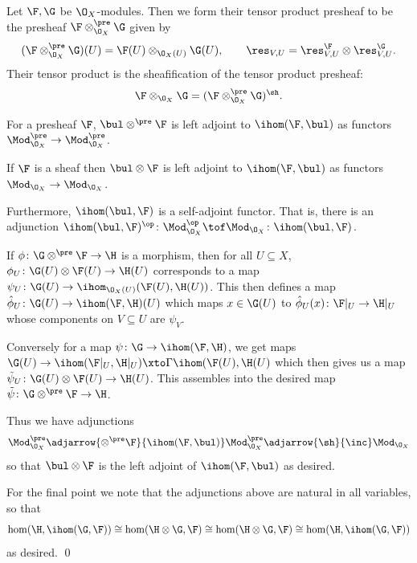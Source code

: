\eexam

\bdefn

    Let $\F,\G$ be $\O_X$-modules.
    Then we form their {\emphcolor tensor product presheaf} to be the presheaf $\F\otimes^\pre_{\O_X}\G$ given by
    $$ (\F\otimes^\pre_{\O_X}\G)(U) = \F(U)\otimes_{\O_X(U)}\G(U),\qquad \res_{V,U} = \res^\F_{V,U}\otimes\res^\G_{V,U} . $$
    Their {\emphcolor tensor product} is the sheafification of the tensor product presheaf:
    $$ \F\otimes_{\O_X}\G = (\F\otimes^\pre_{\O_X}\G)^\sh . $$

\edefn

\bprop

    For a presheaf $\F$, $\bul\otimes^\pre\F$ is left adjoint to $\ihom(\F,\bul)$ as functors
    $\Mod_{\O_X}^\pre\to\Mod_{\O_X}^\pre$.

    If $\F$ is a sheaf then $\bul\otimes\F$ is left adjoint to $\ihom(\F,\bul)$ as functors
    $\Mod_{\O_X}\to\Mod_{\O_X}$.

    Furthermore, $\ihom(\bul,\F)$ is a self-adjoint functor.
    That is, there is an adjunction $\ihom(\bul,\F)^\op\colon\Mod_{\O_X}^\op\tof\Mod_{\O_X}\colon\ihom(\bul,\F)$.

\eprop

\bproof

    If $\phi\colon\G\otimes^\pre\F\to\H$ is a morphism, then for all $U\subseteq X$,
    $\phi_U\colon\G(U)\otimes\F(U)\to\H(U)$ corresponds to a map $\psi_U\colon\G(U)\to\ihom_{\O_X(U)}(\F(U),\H(U))$.
    This then defines a map $\hat\phi_U\colon\G(U)\to\ihom(\F,\H)(U)$ which maps $x\in\G(U)$ to
    $\hat\phi_U(x)\colon\F|_U\to\H|_U$ whose components on $V\subseteq U$ are $\psi_V$.

    Conversely for a map $\psi\colon\G\to\ihom(\F,\H)$, we get maps
    $\G(U)\to\ihom(\F|_U,\H|_U)\xto\Gamma\ihom(\F(U),\H(U)$ which then gives us a map
    $\tilde\psi_U\colon\G(U)\otimes\F(U)\to\H(U)$.
    This assembles into the desired map $\tilde\psi\colon\G\otimes^\pre\F\to\H$.

    Thus we have adjunctions
    $$ \Mod_{\O_X}^\pre \adjarrow{\otimes^\pre\F}{\ihom(\F,\bul)} \Mod_{\O_X}^\pre \adjarrow{\sh}{\inc} \Mod_{\O_X} $$
    so that $\bul\otimes\F$ is the left adjoint of $\ihom(\F,\bul)$ as desired.

    For the final point we note that the adjunctions above are natural in all variables, so that
    $$ \hom(\H,\ihom(\G,\F)) \cong \hom(\H\otimes\G,\F) \cong \hom(\H\otimes\G,\F) \cong \hom(\H,\ihom(\G,\F)) $$
    as desired.
    \qed

